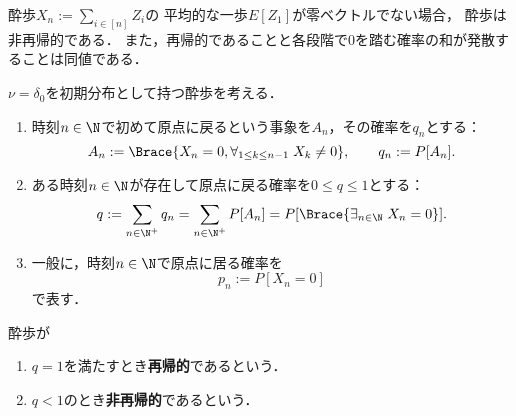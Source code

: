 \documentclass[uplatex,dvipdfmx]{jsreport}
\begin{document}
\begin{tcolorbox}[colframe=ForestGreen, colback=ForestGreen!10!white,breakable,colbacktitle=ForestGreen!40!white,coltitle=black,fonttitle=\bfseries\sffamily,
title=]
    酔歩$X_n:=\sum_{i\in[n]}Z_i$の
    平均的な一歩$E[Z_1]$が零ベクトルでない場合，
    酔歩は非再帰的である．
    また，再帰的であることと各段階で$0$を踏む確率の和が発散することは同値である．
\end{tcolorbox}

\begin{notation}
    $\nu=\delta_0$を初期分布として持つ酔歩を考える．
    \begin{enumerate}
        \item 時刻$n\in\N$で初めて原点に戻るという事象を$A_n$，その確率を$q_n$とする：
        \[A_n:=\Brace{X_n=0,\forall_{1\le k\le n-1}\;X_k\ne0},\qquad q_n:=P[A_n].\]
        \item ある時刻$n\in\N$が存在して原点に戻る確率を$0\le q\le 1$とする：
        \[q:=\sum_{n\in\N^+}q_n=\sum_{n\in\N^+}P[A_n]=P[\Brace{\exists_{n\in\N}\;X_n=0}].\]
        \item 一般に，時刻$n\in\N$で原点に居る確率を
        \[p_n:=P[X_n=0]\]
        で表す．
    \end{enumerate}
\end{notation}

\begin{definition}
    酔歩が
    \begin{enumerate}
        \item $q=1$を満たすとき\textbf{再帰的}であるという．
        \item $q<1$のとき\textbf{非再帰的}であるという．
    \end{enumerate}
\end{definition}
\end{document}
